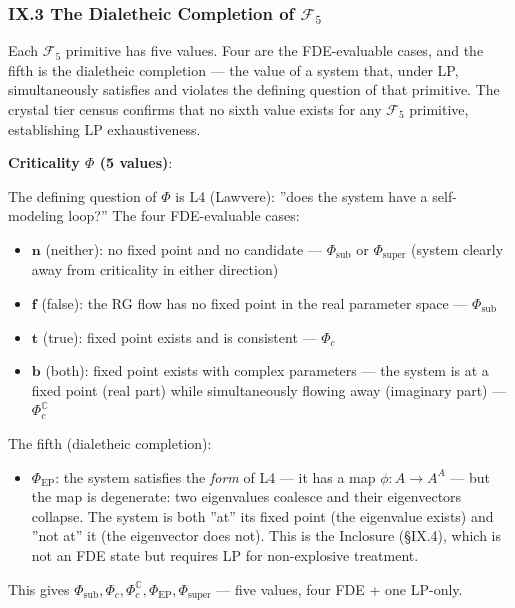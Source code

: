 \documentclass[12pt,a4paper]{article}
\newcommand{\pilcrow}{\S}
\begin{document}
\subsubsection{IX.3 The Dialetheic Completion of $\mathcal{F}_5$}

Each $\mathcal{F}_5$ primitive has five values. Four are the FDE-evaluable cases, and the fifth is the dialetheic completion --- the value of a system that, under LP, simultaneously satisfies and violates the defining question of that primitive. The crystal tier census confirms that no sixth value exists for any $\mathcal{F}_5$ primitive, establishing LP exhaustiveness.

\textbf{Criticality $\Phi$ (5 values)}:

The defining question of $\Phi$ is L4 (Lawvere): ''does the system have a self-modeling loop?'' The four FDE-evaluable cases:

\begin{itemize}
    \item $\mathbf{n}$ (neither): no fixed point and no candidate --- $\Phi_\text{sub}$ or $\Phi_\text{super}$ (system clearly away from criticality in either direction)
    \item $\mathbf{f}$ (false): the RG flow has no fixed point in the real parameter space --- $\Phi_\text{sub}$
    \item $\mathbf{t}$ (true): fixed point exists and is consistent --- $\Phi_c$
    \item $\mathbf{b}$ (both): fixed point exists with complex parameters --- the system is at a fixed point (real part) while simultaneously flowing away (imaginary part) --- $\Phi_c^\mathbb{C}$
\end{itemize}

The fifth (dialetheic completion):

\begin{itemize}
    \item $\Phi_\text{EP}$: the system satisfies the \emph{form} of L4 --- it has a map $\phi: A \to A^A$ --- but the map is degenerate: two eigenvalues coalesce and their eigenvectors collapse. The system is both ''at'' its fixed point (the eigenvalue exists) and ''not at'' it (the eigenvector does not). This is the Inclosure (\pilcrow{}IX.4), which is not an FDE state but requires LP for non-explosive treatment.
\end{itemize}

This gives $\Phi_\text{sub}, \Phi_c, \Phi_c^\mathbb{C}, \Phi_\text{EP}, \Phi_\text{super}$ --- five values, four FDE + one LP-only.
\end{document}
